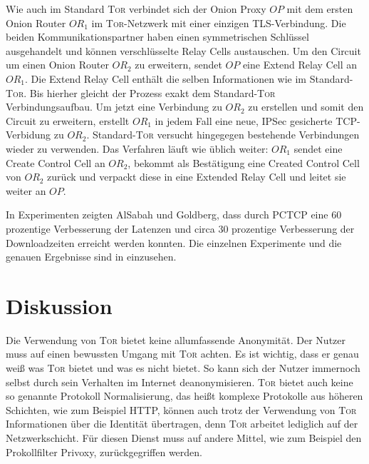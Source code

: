 \documentclass[fleqn,envcountsame,runningheads,10pt,a4paper]{llncs}
\begin{document}
Wie auch im Standard \textsc{Tor} verbindet sich der Onion Proxy $\textit{OP}$ mit dem ersten Onion Router $\textit{OR}_1$ im \textsc{Tor}-Netzwerk mit einer einzigen TLS-Verbindung. Die beiden Kommunikationspartner haben einen symmetrischen Schlüssel ausgehandelt und können verschlüsselte Relay Cells austauschen. Um den Circuit um einen Onion Router $\textit{OR}_2$ zu erweitern, sendet $\textit{OP}$ eine Extend Relay Cell an $\textit{OR}_1$. Die Extend Relay Cell enthält die selben Informationen wie im Standard-\textsc{Tor}. Bis hierher gleicht der Prozess exakt dem Standard-\textsc{Tor} Verbindungsaufbau. Um jetzt eine Verbindung zu $\textit{OR}_2$ zu erstellen und somit den Circuit zu erweitern, erstellt $\textit{OR}_1$ in jedem Fall eine neue, IPSec gesicherte TCP-Verbidung zu $\textit{OR}_2$. Standard-\textsc{Tor} versucht hingegegen bestehende Verbindungen wieder zu verwenden. Das Verfahren läuft wie üblich weiter: $\textit{OR}_1$ sendet eine Create Control Cell an $\textit{OR}_2$, bekommt als Bestätigung eine Created Control Cell von $\textit{OR}_2$ zurück und verpackt diese in eine Extended Relay Cell und leitet sie weiter an $\textit{OP}$.

In Experimenten zeigten AlSabah und Goldberg, dass durch PCTCP eine 60 prozentige Verbesserung der Latenzen und circa 30 prozentige Verbesserung der Downloadzeiten erreicht werden konnten.
Die einzelnen Experimente und die genauen Ergebnisse sind in \cite{pctcp} einzusehen.


\section{Diskussion}
\label{sec:discussion}

Die Verwendung von \textsc{Tor} bietet keine allumfassende Anonymität. Der Nutzer muss auf einen bewussten Umgang mit \textsc{Tor} achten. Es ist wichtig, dass er genau weiß was \textsc{Tor} bietet und was es nicht bietet. So kann sich der Nutzer immernoch selbst durch sein Verhalten im Internet deanonymisieren. \textsc{Tor} bietet auch keine so genannte Protokoll Normalisierung, das heißt komplexe Protokolle aus höheren Schichten, wie zum Beispiel HTTP, können auch trotz der Verwendung von \textsc{Tor} Informationen über die Identität übertragen, denn \textsc{Tor} arbeitet lediglich auf der Netzwerkschicht. Für diesen Dienst muss auf andere Mittel, wie zum Beispiel den Prokollfilter Privoxy, zurückgegriffen werden.
\end{document}
